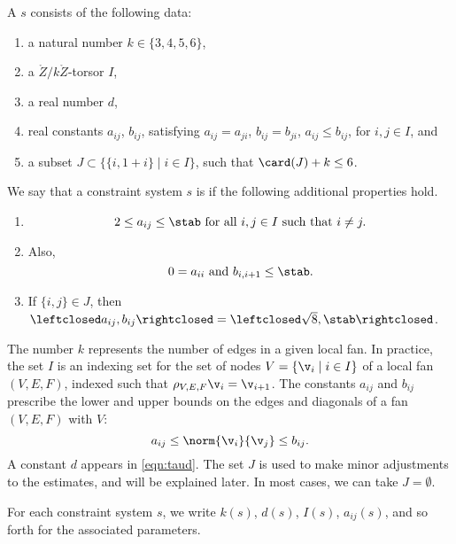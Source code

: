 \begin{definition}
A  $s$ consists of the following data:
\begin{enumerate}
\item a natural number $k\in \{3,4,5,6\}$,
\item a $\ring{Z}/k\ring{Z}$-torsor $I$,
\item a real number $d$,
\item real constants $a_{ij}$, $b_{ij}$,  satisfying
   $a_{ij} = a_{ji}$, $b_{ij}=b_{ji}$, $a_{ij}\le b_{ij}$, for $i,j\in I$, and
\item a subset $J\subset \{ \{i,1+i\} \mid i\in I\}$, 
such that $\card(J)+k\le 6$.
\end{enumerate}
%
We say that a constraint system $s$ is  if the following
additional properties hold.
\begin{enumerate}
\item 
\[
2\le a_{ij}\le \stab \text{ for all }  i,j\in I \text{ such that } i\ne j.
\]  
\item
  Also, 
\[0 = a_{ii}\text{ and }
  b_{i,i+1}\le \stab.
\]  
\item
If $\{i,j\}\in J$, then $\leftclosed
  a_{ij},b_{ij}\rightclosed=\leftclosed\sqrt{8},\stab\rightclosed$.
\end{enumerate}
\end{definition}

\begin{remark}
  The number $k$ represents the number of edges in a given local fan.
  In practice, the set $I$ is an indexing set for the set of nodes
  $V=\{\v_i\mid i\in I\}$ of a local fan $(V,E,F)$, indexed such that
$\rho_{V,E,F}\v_i = \v_{i+1}$.   The constants $a_{ij}$ and
  $b_{ij}$ prescribe the lower and upper bounds on the edges and
  diagonals of a fan $(V,E,F)$ with $V$:
\[
a_{ij}\le \norm{\v_i}{\v_j} \le b_{ij}.
\]
A constant $d$ appears in \eqref{eqn:taud}.    The set $J$ is used to
make minor adjustments to the estimates, and will be explained later.
In most cases, we can take $J=\emptyset$.
\end{remark}

For each constraint system $s$, we write $k(s)$,
$d(s)$, $I(s)$, $a_{ij}(s)$, and so forth for the associated
parameters.  

